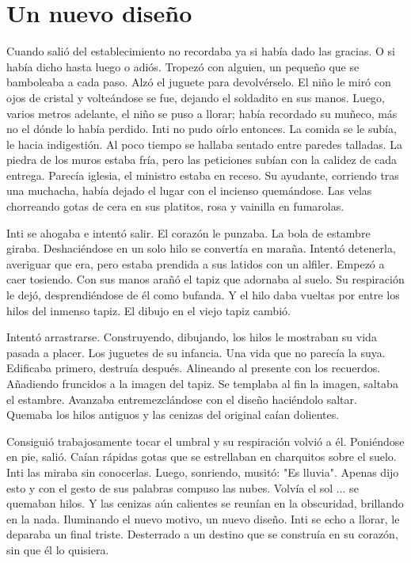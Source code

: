 
\chapter{Un nuevo diseño}
Cuando salió del establecimiento no recordaba ya si había dado las gracias. O si había dicho hasta luego o adiós. Tropezó con alguien, un pequeño que se bamboleaba a cada paso. Alzó el juguete para devolvérselo. El niño le miró con ojos de cristal y volteándose se fue, dejando el soldadito en sus manos. Luego, varios metros adelante, el niño se puso a llorar; había recordado su muñeco, más no el dónde lo había perdido. Inti no pudo oírlo entonces. La comida se le subía, le hacia indigestión. Al poco tiempo se hallaba sentado entre paredes talladas. La piedra de los muros estaba fría, pero las peticiones subían con la calidez de cada entrega. Parecía iglesia, el ministro estaba en receso. Su ayudante, corriendo tras una muchacha, había dejado el lugar con el incienso quemándose. Las velas chorreando gotas de cera en sus platitos, rosa y vainilla en fumarolas.

Inti se ahogaba e intentó salir. El corazón le punzaba. La bola de estambre giraba. Deshaciéndose en un solo hilo se convertía en maraña. Intentó detenerla, averiguar que era, pero estaba prendida a sus latidos con un alfiler. Empezó a caer tosiendo. Con sus manos arañó el tapiz que adornaba al suelo. Su respiración le dejó, desprendiéndose de él como bufanda. Y el hilo daba vueltas por entre los hilos del inmenso tapiz. El dibujo en el viejo tapiz cambió.

Intentó arrastrarse. Construyendo, dibujando, los hilos le mostraban su vida pasada a placer. Los juguetes de su infancia. Una vida que no parecía la suya. Edificaba primero, destruía después. Alineando al presente con los recuerdos. Añadiendo fruncidos a la imagen del tapiz. Se templaba al fin la imagen, saltaba el estambre. Avanzaba entremezclándose con el diseño haciéndolo saltar. Quemaba los hilos antiguos y las cenizas del original caían dolientes.

Consiguió trabajosamente tocar el umbral y su respiración volvió a él. Poniéndose en pie, salió. Caían rápidas gotas que se estrellaban en charquitos sobre el suelo. Inti las miraba sin conocerlas. Luego, sonriendo, musitó: "Es lluvia". Apenas dijo esto y con el gesto de sus palabras compuso las nubes. Volvía el sol ... se quemaban hilos. Y las cenizas aún calientes se reunían en la obscuridad, brillando en la nada. Iluminando el nuevo motivo, un nuevo diseño. Inti se echo a llorar, le deparaba un final triste. Desterrado a un destino que se construía en su corazón, sin que él lo quisiera.


